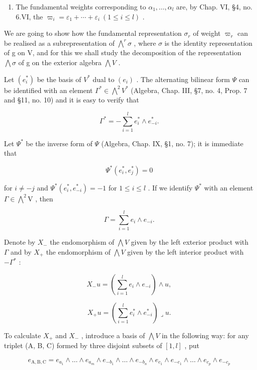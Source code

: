 \begin{enumerate}
\def\labelenumi{(\Roman{enumi})}
\setcounter{enumi}{3}
\tightlist
\item
  The fundamental weights corresponding to \(\alpha_{1},\ldots,\alpha_{l}\) are, by Chap. VI, §4, no. 6.VI, the \(\varpi_{i}=\varepsilon_{1}+\cdots+\varepsilon_{i}\ (1\leq i\leq l)\) .
\end{enumerate}

We are going to show how the fundamental representation \(\sigma_{r}\) of weight \(\varpi_{r}\) can be realised as a subrepresentation of \(\bigwedge^{r}\sigma\) , where \(\sigma\) is the identity representation of g on V, and for this we shall study the decomposition of the representation \(\bigwedge\sigma\) of g on the exterior algebra \(\bigwedge V\) .

Let \((e_{i}^{*})\) be the basis of \(V^{*}\) dual to \((e_{i})\) . The alternating bilinear form \(\varPsi\) can be identified with an element \(\varGamma^{*}\in\bigwedge^{2}V^{*}\) (Algebra, Chap. III, §7, no. 4, Prop. 7 and §11, no. 10) and it is easy to verify that

\[
\Gamma^ {*} = - \sum_ {i = 1} ^ {l} e _ {i} ^ {*} \wedge e _ {- i} ^ {*}.
\]

Let \(\varPsi^{*}\) be the inverse form of \(\varPsi\) (Algebra, Chap. IX, §1, no. 7); it is immediate that

\[
\varPsi^ {*} (e _ {i} ^ {*}, e _ {j} ^ {*}) = 0
\]

for \(i \neq -j\) and \(\Psi^{*}(e_{i}^{*}, e_{-i}^{*}) = -1\) for \(1 \leq i \leq l\) . If we identify \(\Psi^{*}\) with an element \(\Gamma \in \bigwedge^{2}\mathrm{V}\) , then

\[
\Gamma = \sum_ {i = 1} ^ {l} e _ {i} \wedge e _ {- i}.
\]

Denote by \(X_{-}\) the endomorphism of \(\bigwedge V\) given by the left exterior product with \(\Gamma\) and by \(X_{+}\) the endomorphism of \(\bigwedge V\) given by the left interior product with \(-\Gamma^{*}\) :

\[
X _ {-} u = \left(\sum_ {i = 1} ^ {l} e _ {i} \wedge e _ {- i}\right) \wedge u,
\]

\[
X _ {+} u = \left(\sum_ {i = 1} ^ {l} e _ {i} ^ {*} \wedge e _ {- i} ^ {*}\right) \lrcorner u.
\]

To calculate \(X_{+}\) and \(X_{-}\) , introduce a basis of \(\bigwedge V\) in the following way: for any triplet (A, B, C) formed by three disjoint subsets of \([1, l]\) , put

\[
e _ {\mathrm{A,B,C}} = e _ {a _ {1}} \wedge \dots \wedge e _ {a _ {m}} \wedge e _ {- b _ {1}} \wedge \dots \wedge e _ {- b _ {n}} \wedge e _ {c _ {1}} \wedge e _ {- c _ {1}} \wedge \dots \wedge e _ {c _ {p}} \wedge e _ {- c _ {p}}
\]


